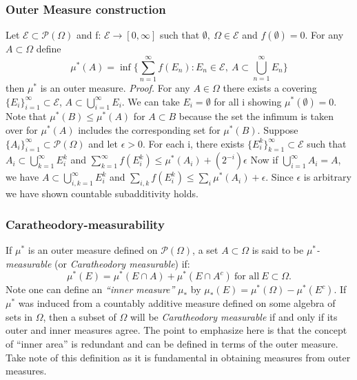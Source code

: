 \documentclass{article}
\begin{document}
\subsubsection{Outer Measure construction}
Let $\mathcal{E} \subset\mathcal{P}(\Omega)$ and f: $\mathcal{E} \to [0,\infty]$ such that $\emptyset, \ \Omega\in\mathcal{E}$ and $f(\emptyset)=0$. For any $A\subset \Omega$ define 
\[
\mu^*(A)=\inf \{\sum_{n=1}^{\infty}f(E_n): E_n \in \mathcal{E}, \ A\subset \bigcup_{n=1}^{\infty}E_n\}
\]
then $\mu^*$ is an outer measure.
\newline \newline
\textit{Proof.}\newline \newline
For any $A \in \Omega$ there exists a covering $\{E_i\}_{i=1}^{\infty}\subset \mathcal{E}$, $A\subset\bigcup_{i=1}^{\infty}E_i.$ We can take $E_i=\emptyset$ for all i showing $\mu^*(\emptyset) = 0$. Note that $\mu^*(B)\leq\mu^*(A)$ for $A\subset B$ because the set the infimum is taken over for $\mu^*(A)$ includes the corresponding set for $\mu^*(B)$. \newline \newline
Suppose $\{A_i\}_{i=1}^{\infty} \subset \mathcal{P}(\Omega)$ and let $\epsilon>0$. For each i, there exists $\{E_i^k\}_{k=1}^{\infty} \subset \mathcal{E}$ such that $A_i \subset \bigcup_{k=1}^{\infty}E^k_i$ and $\sum_{k=1}^{\infty}f(E^k_i) \leq \mu^*(A_i)+(2^{-i})\epsilon$ \newline \newline
Now if $\bigcup_{i=1}^{\infty}A_i=A$, we have $A\subset\bigcup_{i,k=1}^{\infty}E^k_i$ and $\sum_{i,k}f(E^k_i)\leq\sum_i\mu^*(A_i) +\epsilon$. Since $\epsilon$ is arbitrary we have shown countable subadditivity holds.
\subsubsection{Caratheodory-measurability}
If $\mu^*$ is an outer measure defined on $\mathcal{P}(\Omega)$, a set $A\subset \Omega$ is said to be \emph{$\mu^*$-measurable} (or \emph{Caratheodory measurable}) if:
\[
\mu^*(E) = \mu^*(E\cap A)+\mu^*(E\cap A^c) \ \text{for all} \ E \subset \Omega.
\]
Note one can define an \emph{``inner measure''} $\mu_*$ by $\mu_*(E)=\mu^*(\Omega)-\mu^*(E^c)$. If $\mu^*$ was induced from a countably additive measure defined on some algebra of sets in $\Omega$, then a subset of $\Omega$ will be \emph{Caratheodory measurable} if and only if its outer and inner measures agree.
\newline \newline 
The point to emphasize here is that the concept of ``inner area'' is redundant and can be defined in terms of the outer measure. Take note of this definition as it is fundamental in obtaining measures from outer measures.
\end{document}
